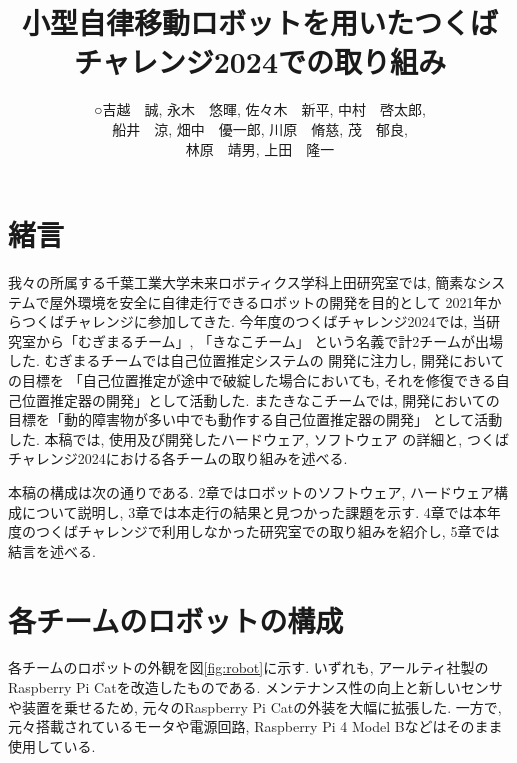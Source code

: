 \documentclass[twocolumn,9pt]{jsproceedings}
\title{小型自律移動ロボットを用いたつくばチャレンジ2024での取り組み}
\author{○吉越　誠\authorrefmark{2}, 永木　悠暉\authorrefmark{1}, 佐々木　新平\authorrefmark{1}, 中村　啓太郎\authorrefmark{1}, 
\\船井　涼\authorrefmark{2}, 畑中　優一郎\authorrefmark{2}, 川原　脩慈\authorrefmark{1}, 茂　郁良\authorrefmark{1}, 
\\林原　靖男\authorrefmark{1}, 上田　隆一\authorrefmark{1}}
\affiliation{千葉工業大学 未来ロボティクス学科 上田研究室 むぎまるチーム/きなこチーム}
\begin{document}
\maketitle


\section{緒言}

我々の所属する千葉工業大学未来ロボティクス学科上田研究室では, 
簡素なシステムで屋外環境を安全に自律走行できるロボットの開発を目的として
2021年からつくばチャレンジに参加してきた. 
今年度のつくばチャレンジ2024では, 
当研究室から「むぎまるチーム」, 「きなこチーム」
という名義で計2チームが出場した. 
むぎまるチームでは自己位置推定システムの
開発に注力し, 開発においての目標を
「自己位置推定が途中で破綻した場合においても, 
それを修復できる自己位置推定器の開発」として活動した. 
またきなこチームでは, 
開発においての目標を「動的障害物が多い中でも動作する自己位置推定器の開発」
として活動した. 
本稿では, 使用及び開発したハードウェア, ソフトウェア
の詳細と, つくばチャレンジ2024における各チームの取り組みを述べる. 

本稿の構成は次の通りである. 
2章ではロボットのソフトウェア, ハードウェア構成について説明し, 
3章では本走行の結果と見つかった課題を示す. 
4章では本年度のつくばチャレンジで利用しなかった研究室での取り組みを紹介し, 
5章では結言を述べる. 

\section{各チームのロボットの構成}
各チームのロボットの外観を図\ref{fig:robot}に示す. 
いずれも, アールティ社製の
Raspberry Pi Cat\cite{RTshop}を改造したものである. 
メンテナンス性の向上と新しいセンサや装置を乗せるため, 
元々のRaspberry Pi Catの外装を大幅に拡張した. 
一方で, 元々搭載されているモータや電源回路, 
Raspberry Pi 4 Model Bなどはそのまま使用している. 
\end{document}
